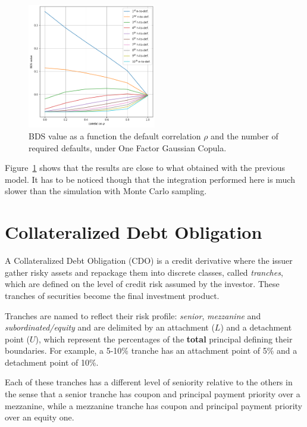 \begin{figure}[htb]
\centering
\includegraphics[width=0.5\textwidth]{figures/bds_value_one_factor}
\caption{BDS value as a function the default correlation $\rho$ and the number of required defaults, under One Factor Gaussian Copula.}
\label{fig:bds_value_one_factor}
\end{figure}

Figure~\ref{fig:bds_value_one_factor} shows that the results are close to what obtained with the previous model. It has to be noticed though that the integration performed here is much slower than the simulation with Monte Carlo sampling.

\section{Collateralized Debt Obligation}\label{collateralized-debt-obligation}

A Collateralized Debt Obligation (CDO) is a credit derivative where the issuer gather risky assets and repackage them into discrete classes, called \emph{tranches}, which are defined on the level of credit risk assumed by the investor. These tranches of securities become the final investment product.

Tranches are named to reflect their risk profile: \emph{senior}, \emph{mezzanine} and \emph{subordinated/equity} and are delimited by an attachment ($L$) and a detachment point ($U$), which represent the percentages of the \textbf{total} principal defining their boundaries. For example, a 5-10\% tranche has an attachment point of 5\% and a detachment point of 10\%. 

Each of these tranches has a different level of seniority relative to the others in the sense that a senior tranche has coupon and principal payment priority over a mezzanine, while a mezzanine tranche has coupon and principal payment priority over an equity one. 

